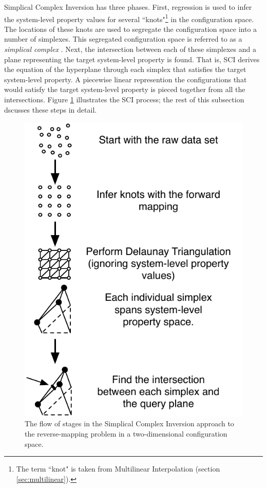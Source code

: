 Simplical Complex Inversion has three phases.
First, regression is used to infer the system-level property values for several ``knots"\footnote{The term ``knot" is taken from Multilinear Interpolation\cite{davies1997multidimensional} (section \ref{sec:multilinear}).} in the configuration space.
The locations of these knots are used to segregate the configuration space into a number of simplexes.
This segregated configuration space is referred to as a \textit{simplical complex} \cite{munkres1993simplicial}.
Next, the intersection between each of these simplexes and a plane representing the target system-level property is found.
That is, SCI derives the equation of the hyperplane through each simplex that satisfies the target system-level property.
A piecewise linear represention the configurations that would satisfy the target system-level property is pieced together from all the intersections.
Figure \ref{fig:ISFlow} illustrates the SCI process; the rest of this subsection dscusses these steps in detail.

\begin{figure}[ht]
\centering
\includegraphics[scale=1]{images/ISflow.pdf}
\caption{The flow of stages in the Simplical Complex Inversion approach to the reverse-mapping problem in a two-dimensional configuration space.}
\label{fig:ISFlow}
\end{figure}

